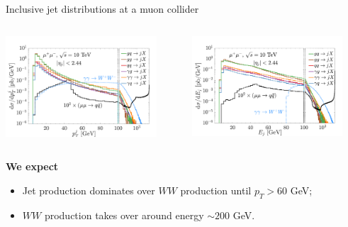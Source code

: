 \documentclass[aspectratio=169]{beamer}
\begin{document}
\begin{frame}{Inclusive jet distributions at a muon collider}
\begin{columns}	
	\begin{column}{0.48\textwidth}
		\includegraphics[width=0.88\textwidth]{figs/dPTj_mu10TeV_10d_3pt_s20}
	\end{column}
	\begin{column}{0.48\textwidth}
		\includegraphics[width=0.88\textwidth]{figs/dEj_mu10TeV_10d_3pt_s20}
	\end{column}
\end{columns}
\textcolor{PittRoyal}{\bf We expect}
\begin{itemize}
	\item Jet production dominates over $WW$ production until $p_T>60$ GeV;
	\item $WW$ production takes over around energy $\sim 200$ GeV.
\end{itemize}
\end{frame}
\end{document}
